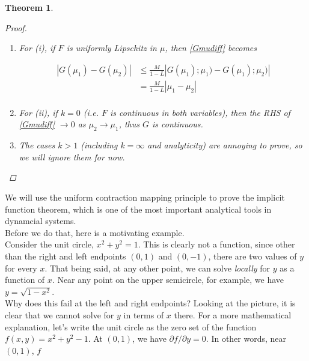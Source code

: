 \documentclass{article}
\newtheorem{theorem}{Theorem}[section]
\begin{document}
\begin{theorem}
\begin{proof}
\begin{enumerate}
Divide by $(1 - L)$ to get 

\begin{align}\label{Gmudiff}
|G(\mu_1) - G(\mu_2)| &\leq \frac{1}{1-L}|F( G(\mu_1); \mu_1) - F(G(\mu_1); \mu_2)|
\end{align}

\item For (i), if $F$ is uniformly Lipschitz in $\mu$, then \eqref{Gmudiff} becomes 

\begin{align*}
|G(\mu_1) - G(\mu_2)| &\leq \frac{M}{1-L}| G(\mu_1); \mu_1) - G(\mu_1); \mu_2)| \\
&= \frac{M}{1-L} |\mu_1 - \mu_2| \\
\end{align*}

\item For (ii), if $k = 0$ (i.e. $F$ is continuous in both variables), then the RHS of \eqref{Gmudiff} $\rightarrow 0$ as $\mu_2 \rightarrow \mu_1$, thus $G$ is continuous.

\item The cases $k > 1$ (including $k = \infty$ and analyticity) are annoying to prove, so we will ignore them for now.

\end{enumerate}

\end{proof}
\end{theorem}

We will use the uniform contraction mapping principle to prove the implicit function theorem, which is one of the most important analytical tools in dynamcial systems.\\

Before we do that, here is a motivating example.\\

Consider the unit circle, $x^2 + y^2 = 1$. This is clearly not a function, since other than the right and left endpoints $(0, 1)$ and $(0, -1)$, there are two values of $y$ for every $x$. That being said, at any other point, we can solve \emph{locally} for $y$ as a function of $x$. Near any point on the upper semicircle, for example, we have $y = \sqrt{1 - x^2}$. \\

Why does this fail at the left and right endpoints? Looking at the picture, it is clear that we cannot solve for $y$ in terms of $x$ there. For a more mathematical explanation, let's write the unit circle as the zero set of the function $f(x, y) = x^2 + y^2 - 1$. At $(0, 1)$, we have $\partial f / \partial y = 0$. In other words, near $(0, 1)$, $f$
\end{document}
